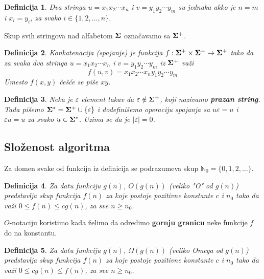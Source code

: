 \documentclass[a4paper,12pt]{article}
\newtheorem{dfn}{Definicija}[section]
\begin{document}
\begin{dfn}

Dva stringa $u = x_1x_2 \cdots x_n$ i $v = y_1y_2 \cdots y_m$ su jednaka akko je $n = m$ i $x_i = y_i$, za svako $i \in \{ 1, 2, \ldots, n \}$.

\end{dfn}

Skup svih stringova nad alfabetom $\bf \Sigma$ ozna\v cavamo sa $\bf \Sigma^+$.

\begin{dfn}

Konkatenacija (spajanje) je funkcija $f : {\bf \Sigma^+} \times {\bf \Sigma^+} \rightarrow {\bf \Sigma^+}$ tako da za svaka dva stringa $u = x_1x_2 \cdots x_n$ i $v = y_1y_2 \cdots y_m$ iz $\bf \Sigma^+$ va\v zi $$ f(u, v) = x_1x_2 \cdots x_ny_1y_2 \cdots y_m$$ Umesto $f(x, y)$ \v ce\v s\' ce se pi\v se $xy$.

\end{dfn}

\begin{dfn}

Neka je $\varepsilon$ element takav da $\varepsilon \notin {\bf \Sigma^+}$, koji nazivamo {\bf prazan string}. Tada pi\v semo ${\bf \Sigma^\ast} = {\bf \Sigma^+} \cup \{ \varepsilon \}$ i dodefini\v semo operaciju spajanja sa $u\varepsilon = u$ i $\varepsilon u = u$ za svako $u \in {\bf \Sigma^\ast}$. Uzima se da je $|\varepsilon| = 0$.

\end{dfn}

\subsection{Slo\v zenost algoritma}

Za domen svake od funkcija iz definicija se podrazumeva skup $\mathbb{N}_0 = \{0, 1, 2, \ldots\}$.

\begin{dfn}

Za datu funkciju $g(n)$, $O(g(n))$ (veliko "O" od $g(n)$) predstavlja skup funkcija $f(n)$ za koje postoje pozitivne konstante $c$ i $n_0$ tako da va\v zi $0 \leq f(n) \leq cg(n)$, za sve $n \geq n_0$.

\end{dfn}

$O$-notaciju koristimo kada \v zelimo da odredimo {\bf gornju granicu} neke funkcije $f$ do na konstantu.

\begin{dfn}

Za datu funkciju $g(n)$, $\Omega(g(n))$ (veliko Omega od $g(n)$) predstavlja skup funkcija $f(n)$ za koje postoje pozitivne konstante $c$ i $n_0$ tako da va\v zi $0 \leq cg(n) \leq f(n)$, za sve $n \geq n_0$.

\end{dfn}
\end{document}
